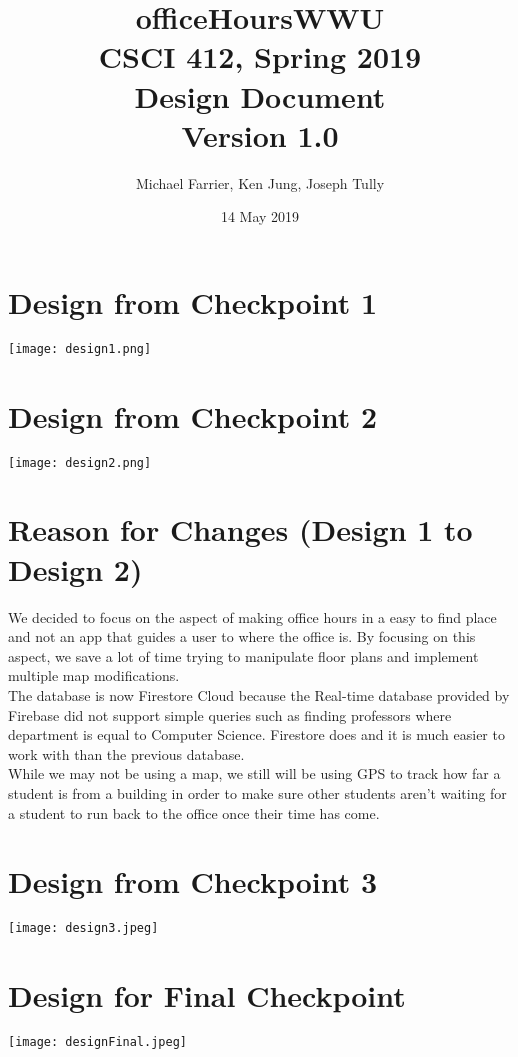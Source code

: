 \documentclass[11pt]{article} %
\begin{document}
\title{officeHoursWWU\\ CSCI 412, Spring 2019\\ Design Document \\ Version 1.0}
\author{Michael Farrier, Ken Jung, Joseph Tully}
\date{14 May 2019}
\maketitle

\pagebreak

\section{Design from Checkpoint 1}
\begin{center}
\texttt{[image: design1.png]}\\
\end{center}

\pagebreak

\section{Design from Checkpoint 2}
\begin{center}
\texttt{[image: design2.png]}\\
\end{center}

\pagebreak

\section{Reason for Changes (Design 1 to Design 2)}
We decided to focus on the aspect of making office hours in a easy to find place and not an app that guides a user to where the office is. By focusing on this aspect, we save a lot of time trying to manipulate floor plans and implement multiple map modifications. \\

The database is now Firestore Cloud because the Real-time database provided by Firebase did not support simple queries such as finding professors where department is equal to Computer Science. Firestore does and it is much easier to work with than the previous database. \\

While we may not be using a map, we still will be using GPS to track how far a student is from a building in order to make sure other students aren't waiting for a student to run back to the office once their time has come. 

\pagebreak

\section{Design from Checkpoint 3}
\begin{center}
\texttt{[image: design3.jpeg]}\\
\end{center}

\pagebreak

\section{Design for Final Checkpoint}
\begin{center}
\texttt{[image: designFinal.jpeg]}\\
\end{center}
\end{document}
